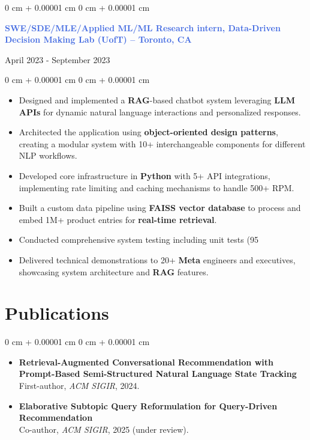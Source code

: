 \documentclass[10pt, letterpaper]{article}
\newenvironment{highlights}{
    \begin{itemize}[
        topsep=0.10 cm,
        parsep=0.10 cm,
        partopsep=0pt,
        itemsep=0pt,
        leftmargin=0 cm + 10pt
    ]
}{
    \end{itemize}
}
\newenvironment{onecolentry}{
    \begin{adjustwidth}{
        0 cm + 0.00001 cm
    }{
        0 cm + 0.00001 cm
    }
}{
    \end{adjustwidth}
}
\newenvironment{twocolentry}[2][]{
    \onecolentry
    \def\secondColumn{#2}
    \setcolumnwidth{\fill, 4.5 cm}
    \begin{paracol}{2}
}{
    \switchcolumn \raggedleft \secondColumn
    \end{paracol}
    \endonecolentry
}
\begin{document}
\vspace{0.25 cm}
\begin{twocolentry}{April 2023 - September 2023}
 \textcolor{royalblue}{\textbf{SWE/SDE/MLE/Applied ML/ML Research intern, Data-Driven Decision Making Lab (UofT) -- Toronto, CA}}
\end{twocolentry}
\begin{onecolentry}
    \begin{highlights}
        \item Designed and implemented a \textbf{RAG}-based chatbot system leveraging \textbf{LLM APIs} for dynamic natural language interactions and personalized responses.
        \item Architected the application using \textbf{object-oriented design patterns}, creating a modular system with 10+ interchangeable components for different NLP workflows.
        \item Developed core infrastructure in \textbf{Python} with 5+ API integrations, implementing rate limiting and caching mechanisms to handle 500+ RPM.
        \item Built a custom data pipeline using \textbf{FAISS vector database} to process and embed 1M+ product entries for \textbf{real-time retrieval}.
        \item Conducted comprehensive system testing including unit tests (95%
        \item Delivered technical demonstrations to 20+ \textbf{Meta} engineers and executives, showcasing system architecture and \textbf{RAG} features.
    \end{highlights}
\end{onecolentry}

\section{Publications}
\begin{onecolentry}
    \begin{highlights}
    \item \textbf{Retrieval-Augmented Conversational Recommendation with Prompt-Based Semi-Structured Natural Language State Tracking} \\
    First-author, \textit{ACM SIGIR}, 2024. 

    \item \textbf{Elaborative Subtopic Query Reformulation for Query-Driven Recommendation} \\
    Co-author, \textit{ACM SIGIR}, 2025 (under review). %
    \end{highlights}
\end{onecolentry}
\end{document}
